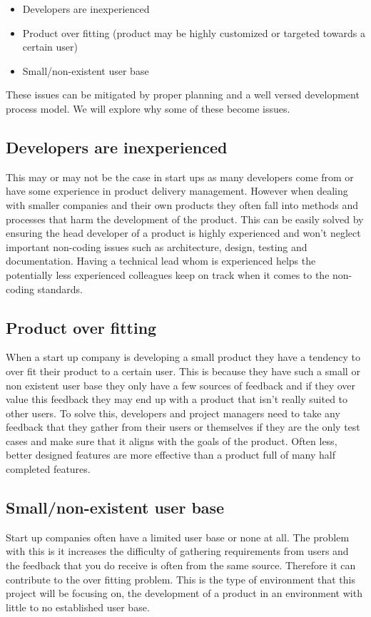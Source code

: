 \begin{itemize}
\item Developers are inexperienced
\item Product over fitting (product may be highly customized or targeted towards a certain user)
\item Small/non-existent user base
\end{itemize}

These issues can be mitigated by proper planning and a well versed development process model. We will explore why some of these become issues.

\subsection{Developers are inexperienced}
This may or may not be the case in start ups as many developers come from or have some experience in product delivery management. However when dealing with smaller companies and their own products they often fall into methods and processes that harm the development of the product. This can be easily solved by ensuring the head developer of a product is highly experienced and won’t neglect important non-coding issues such as architecture, design, testing and documentation. Having a technical lead whom is experienced helps the potentially less experienced colleagues keep on track when it comes to the non-coding standards.

\subsection{Product over fitting}
When a start up company is developing a small product they have a tendency to over fit their product to a certain user. This is because they have such a small or non existent user base they only have a few sources of feedback and if they over value this feedback they may end up with a product that isn’t really suited to other users. To solve this, developers and project managers need to take any feedback that they gather from their users or themselves if they are the only test cases and make sure that it aligns with the goals of the product. Often less, better designed features are more effective than a product full of many half completed features.

\subsection{Small/non-existent user base}
Start up companies often have a limited user base or none at all. The problem with this is it increases the difficulty of gathering requirements from users and the feedback that you do receive is often from the same source. Therefore it can contribute to the over fitting problem. This is the type of environment that this project will be focusing on, the development of a product in an environment with little to no established user base.

